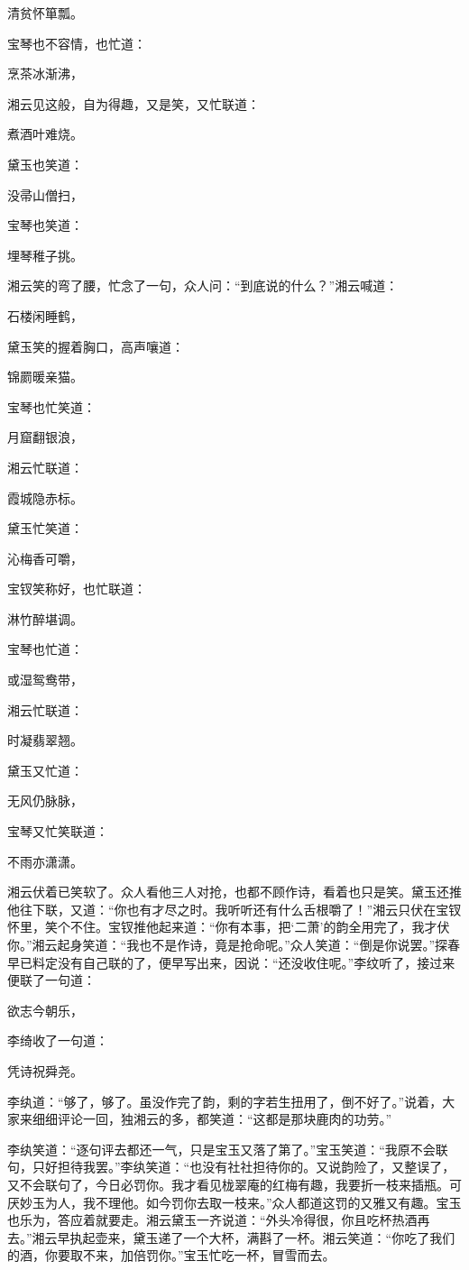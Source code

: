 清贫怀箪瓢。

宝琴也不容情，也忙道：

烹茶冰渐沸，

湘云见这般，自为得趣，又是笑，又忙联道：

煮酒叶难烧。

黛玉也笑道：

没帚山僧扫，

宝琴也笑道：

埋琴稚子挑。

湘云笑的弯了腰，忙念了一句，众人问：“到底说的什么？”湘云喊道：

石楼闲睡鹤，

黛玉笑的握着胸口，高声嚷道：

锦罽暖亲猫。

宝琴也忙笑道：

月窟翻银浪，

湘云忙联道：

霞城隐赤标。

黛玉忙笑道：

沁梅香可嚼，

宝钗笑称好，也忙联道：

淋竹醉堪调。

宝琴也忙道：

或湿鸳鸯带，

湘云忙联道：

时凝翡翠翘。

黛玉又忙道：

无风仍脉脉，

宝琴又忙笑联道：

不雨亦潇潇。

湘云伏着已笑软了。众人看他三人对抢，也都不顾作诗，看着也只是笑。黛玉还推他往下联，又道：“你也有才尽之时。我听听还有什么舌根嚼了！”湘云只伏在宝钗怀里，笑个不住。宝钗推他起来道：“你有本事，把‘二萧’的韵全用完了，我才伏你。”湘云起身笑道：“我也不是作诗，竟是抢命呢。”众人笑道：“倒是你说罢。”探春早已料定没有自己联的了，便早写出来，因说：“还没收住呢。”李纹听了，接过来便联了一句道：

欲志今朝乐，

李绮收了一句道：

凭诗祝舜尧。

李纨道：“够了，够了。虽没作完了韵，剩的字若生扭用了，倒不好了。”说着，大家来细细评论一回，独湘云的多，都笑道：“这都是那块鹿肉的功劳。”

李纨笑道：“逐句评去都还一气，只是宝玉又落了第了。”宝玉笑道：“我原不会联句，只好担待我罢。”李纨笑道：“也没有社社担待你的。又说韵险了，又整误了，又不会联句了，今日必罚你。我才看见栊翠庵的红梅有趣，我要折一枝来插瓶。可厌妙玉为人，我不理他。如今罚你去取一枝来。”众人都道这罚的又雅又有趣。宝玉也乐为，答应着就要走。湘云黛玉一齐说道：“外头冷得很，你且吃杯热酒再去。”湘云早执起壶来，黛玉递了一个大杯，满斟了一杯。湘云笑道：“你吃了我们的酒，你要取不来，加倍罚你。”宝玉忙吃一杯，冒雪而去。

